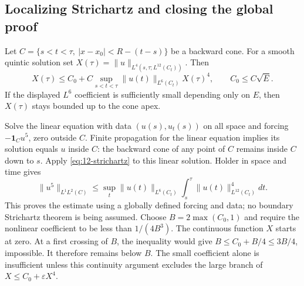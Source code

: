 \subsection{Localizing Strichartz and closing the global proof}
\begin{lemma}
Let $C=\{s<t<\tau,\ |x-x_0|<R-(t-s)\}$ be a backward cone.
For a smooth quintic solution set
$X(\tau)=\|u\|_{L^4(s,\tau;L^{12}(C_t))}$.
Then
\begin{equation}\label{eq:12-cone-strichartz}
 X(\tau)\le C_0+C\sup_{s<t<\tau}\|u(t)\|_{L^6(C_t)}X(\tau)^4,
 \qquad C_0\le C\sqrt E.
\end{equation}
If the displayed $L^6$ coefficient is sufficiently small depending
only on $E$, then $X(\tau)$ stays bounded up to the cone apex.
\end{lemma}
\begin{expandedproof}
Solve the linear equation with data $(u(s),u_t(s))$ on all space
and forcing $-\mathbf1_Cu^5$, zero outside $C$. Finite propagation
for the linear equation implies its solution equals $u$ inside $C$:
the backward cone of any point of $C$ remains inside $C$ down to $s$.
Apply \eqref{eq:12-strichartz} to this linear solution. Holder in
space and time gives
\[
 \|u^5\|_{L^1L^2(C)}
 \le\sup_t\|u(t)\|_{L^6(C_t)}
                 \int_s^\tau\|u(t)\|_{L^{12}(C_t)}^4dt.
\]
This proves the estimate using a globally defined forcing and data;
no boundary Strichartz theorem is being assumed.
Choose $B=2\max(C_0,1)$ and require the nonlinear coefficient to be
less than $1/(4B^3)$. The continuous function $X$ starts at zero.
At a first crossing of $B$, the inequality would give
$B\le C_0+B/4\le3B/4$, impossible. It therefore remains below $B$.
The small coefficient alone is insufficient unless this continuity
argument excludes the large branch of $X\le C_0+\varepsilon X^4$.
\end{expandedproof}

